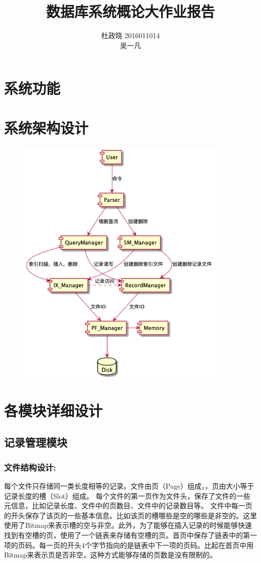 \documentclass[11pt,UTF8]{report}
\title{数据库系统概论大作业报告}
\author{杜政晓 2016011014\\
吴一凡 }
\begin{document}
\maketitle

\section{系统功能}

\section{系统架构设计}
\begin{figure}[!ht]
	\centering
	\includegraphics[width=0.9\textwidth]{structure}
\end{figure}
\section{各模块详细设计}
\subsection{记录管理模块}
\subsubsection{文件结构设计:}
每个文件只存储同一类长度相等的记录。文件由页（Page）组成，，页由大小等于记录长度的槽（Slot）组成。
每个文件的第一页作为文件头，保存了文件的一些元信息，比如记录长度、文件中的页数目、文件中的记录数目等。
文件中每一页的开头保存了该页的一些基本信息。比如该页的槽哪些是空的哪些是非空的。这里使用了Bitmap来表示槽的空与非空。此外，为了能够在插入记录的时候能够快速找到有空槽的页，使用了一个链表来存储有空槽的页。首页中保存了链表中的第一项的页码。每一页的开头4个字节指向的是链表中下一项的页码。比起在首页中用Bitmap来表示页是否非空，这种方式能够存储的页数是没有限制的。
\end{document}
